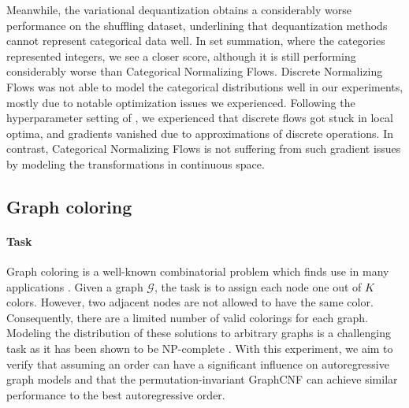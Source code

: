 Meanwhile, the variational dequantization obtains a considerably worse performance on the shuffling dataset, underlining that dequantization methods cannot represent categorical data well. 
In set summation, where the categories represented integers, we see a closer score, although it is still performing considerably worse than Categorical Normalizing Flows. 
Discrete Normalizing Flows was not able to model the categorical distributions well in our experiments, mostly due to notable optimization issues we experienced. 
Following the hyperparameter setting of \citet{TranDiscreteFlows}, we experienced that discrete flows got stuck in local optima, and gradients vanished due to approximations of discrete operations. 
In contrast, Categorical Normalizing Flows is not suffering from such gradient issues by modeling the transformations in continuous space.

\subsection{Graph coloring}
\label{sec:experiments_graph_coloring}

\paragraph{Task} Graph coloring is a well-known combinatorial problem which finds use in many applications \cite{bondy1976graph, GraphColoringDL, GraphColoringApplications}. 
Given a graph $\mathcal{G}$, the task is to assign each node one out of $K$ colors. However, two adjacent nodes are not allowed to have the same color. 
Consequently, there are a limited number of valid colorings for each graph. 
Modeling the distribution of these solutions to arbitrary graphs is a challenging task as it has been shown to be NP-complete \cite{bondy1976graph}. 
With this experiment, we aim to verify that assuming an order can have a significant influence on autoregressive graph models and that the permutation-invariant GraphCNF can achieve similar performance to the best autoregressive order.

